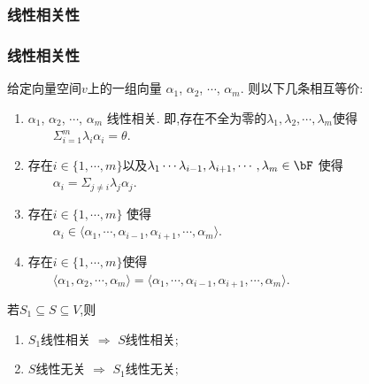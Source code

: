 \subsubsection{线性相关性}
\begin{frame}\frametitle{线性相关性}
\begin{theorem}[线性相关等价刻画] \small
给定向量空间$v$上的一组向量 $\alpha_1$, $\alpha_2$, $\cdots$, $\alpha_m$. 则以下几条相互等价:\pp
\begin{enumerate}
\item $\alpha_1$, $\alpha_2$, $\cdots$, $\alpha_m$ 线性相关. 即,存在不全为零的$\lambda_1,\lambda_2,\cdots,\lambda_{m}$使得\\ $\qquad\Sigma_{i=1}^m \lambda_i\alpha_i=\theta$. \pp
\item 存在$i\in\{1,\cdots,m\}$以及$\lambda_1\cdots\lambda_{i-1},\lambda_{i+1},\cdots,\lambda_m\in \bF$ 使得\\
$\qquad\alpha_i = \Sigma_{j\neq i} \lambda_j \alpha_j$.\pp
\item 存在$i\in\{1,\cdots,m\}$ 使得\\
$\qquad\alpha_i \in \langle \alpha_1,\cdots,\alpha_{i-1},\alpha_{i+1},\cdots,\alpha_m\rangle$.\pp
\item 存在$i\in\{1,\cdots,m\}$使得\\
$\qquad\langle \alpha_1,\alpha_{2},\cdots,\alpha_m\rangle = \langle \alpha_1,\cdots,\alpha_{i-1},\alpha_{i+1},\cdots,\alpha_m\rangle$.
\end{enumerate}
\end{theorem}
\pp
{}

\begin{theorem}
若$S_1\subseteq S\subseteq V$,\pp 则
\begin{enumerate}
\item $S_1$线性相关 $\Rightarrow$ $S$线性相关;\pp
\item $S$线性无关 $\Rightarrow$ $S_1$线性无关;
\end{enumerate}
\end{theorem}

\end{frame}






